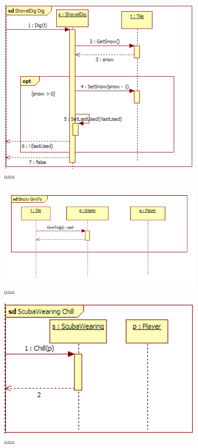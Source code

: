 \begin{figure}[H]
	\begin{center}
		\includegraphics[width=10cm]{chapters/chapter03/seqdiag/ShovelDig_Dig.png}
		\caption{aaa}
		\label{bbb}
	\end{center}
\end{figure}
\begin{figure}[H]
	\begin{center}
		\includegraphics[width=10cm]{chapters/chapter03/seqdiag/Empty_GiveTo.png}
		\caption{aaa}
		\label{bbb}
	\end{center}
\end{figure}
\begin{figure}[H]
	\begin{center}
		\includegraphics[width=10cm]{chapters/chapter03/seqdiag/ScubaWearing_Chill.png}
		\caption{aaa}
		\label{bbb}
	\end{center}
\end{figure}

